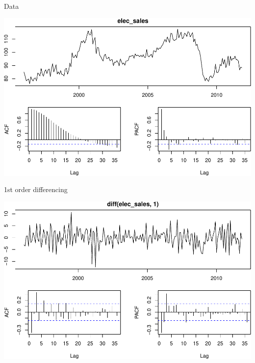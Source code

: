 \documentclass[11pt,ignorenonframetext,]{beamer}
\begin{document}
\begin{frame}{%
\protect\hypertarget{data}{%
Data}}

\begin{center}\includegraphics[width=\textwidth]{Lec09_files/figure-beamer/unnamed-chunk-22-1} \end{center}

\end{frame}

\begin{frame}{%
\protect\hypertarget{st-order-differencing}{%
1st order differencing}}

\begin{center}\includegraphics[width=\textwidth]{Lec09_files/figure-beamer/unnamed-chunk-23-1} \end{center}

\end{frame}
\end{document}
